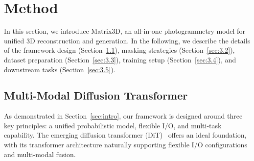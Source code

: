 

\section{Method}
\label{sec:method}
In this section, we introduce Matrix3D, an all-in-one photogrammetry model for unified 3D reconstruction and generation. 
In the following, we describe the details of the framework design (Section~\ref{sec:3.1}), masking strategies (Section~\ref{sec:3.2}), dataset preparation (Section~\ref{sec:3.3}), training setup (Section~\ref{sec:3.4}), and downstream tasks (Section~\ref{sec:3.5}).


\subsection{Multi-Modal Diffusion Transformer}
\label{sec:3.1}
As demonstrated in Section~\ref{sec:intro}, our framework is designed around three key principles: a unified probabilistic model, flexible I/O, and multi-task capability. The emerging diffusion transformer (DiT)~\cite{peebles2023scalable} offers an ideal foundation, with its transformer architecture naturally supporting flexible I/O configurations and multi-modal fusion.

